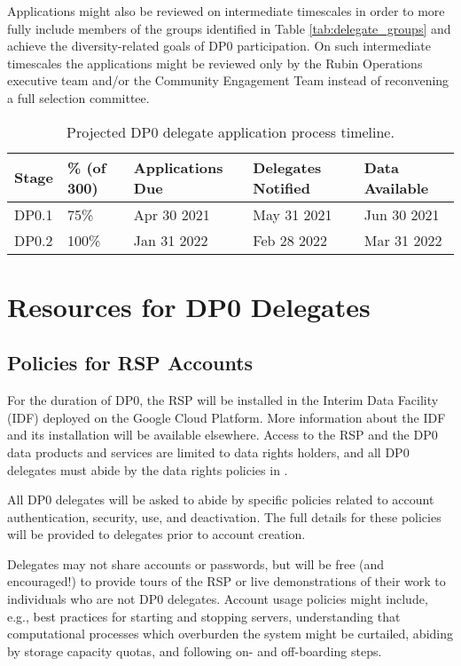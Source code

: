 \documentclass[DM,lsstdraft,authoryear,toc]{lsstdoc}
\begin{document}
Applications might also be reviewed on intermediate timescales in order to more fully include members of the groups identified in Table \ref{tab:delegate_groups} and achieve the diversity-related goals of DP0 participation.
On such intermediate timescales the applications might be reviewed only by the Rubin Operations executive team and/or the Community Engagement Team instead of reconvening a full selection committee. 

\begin{table}[!h]
\centering
\caption{Projected DP0 delegate application process timeline.}\label{tab:selection_timeline}
\begin{tabular}{lllll}
\hline
Stage & \% (of 300) & Applications Due & Delegates Notified & Data Available \\
\hline \hline
DP0.1 & 75\%    &  Apr 30 2021   &  May 31 2021  &  Jun 30 2021 \\
DP0.2 & 100\%  &  Jan 31 2022   &  Feb 28 2022  &  Mar 31 2022 \\
\hline
\end{tabular}
\end{table}


\section{Resources for DP0 Delegates}\label{sec:res}

\subsection{Policies for RSP Accounts}\label{ssec:res_pol}

For the duration of DP0, the RSP will be installed in the Interim Data Facility (IDF) deployed on the Google Cloud Platform.
More information about the IDF and its installation will be available elsewhere.
Access to the RSP and the DP0 data products and services are limited to data rights holders, and all DP0 delegates must abide by the data rights policies in .

All DP0 delegates will be asked to abide by specific policies related to account authentication, security, use, and deactivation.
The full details for these policies will be provided to delegates prior to account creation. 

Delegates may not share accounts or passwords, but will be free (and encouraged!) to provide tours of the RSP or live demonstrations of their work to individuals who are not DP0 delegates.
Account usage policies might include, e.g., best practices for starting and stopping servers, understanding that computational processes which overburden the system might be curtailed, abiding by storage capacity quotas, and following on- and off-boarding steps.
\end{document}

